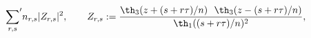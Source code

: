 \begin{equation}
  {\sum_{r,s}}' n_{r,s} |Z_{r,s}|^2, \qquad Z_{r,s}:=
  {\th_3(z+(s+r\tau)/n)~~\th_3(z-(s+r\tau)/n) \over
  \th_1((s+r\tau)/n)^2},
\end{equation}

